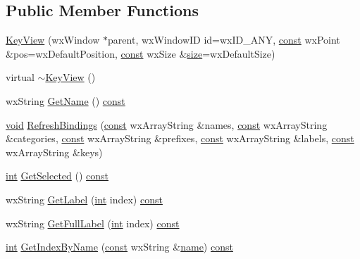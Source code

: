 \subsection*{Public Member Functions}
\begin{DoxyCompactItemize}
\item 
\hyperlink{class_key_view_a81715d180318fd6ce1ee5f579bc7c4a9}{Key\+View} (wx\+Window $\ast$parent, wx\+Window\+ID id=wx\+I\+D\+\_\+\+A\+NY, \hyperlink{getopt1_8c_a2c212835823e3c54a8ab6d95c652660e}{const} wx\+Point \&pos=wx\+Default\+Position, \hyperlink{getopt1_8c_a2c212835823e3c54a8ab6d95c652660e}{const} wx\+Size \&\hyperlink{group__lavu__mem_ga854352f53b148adc24983a58a1866d66}{size}=wx\+Default\+Size)
\item 
virtual \hyperlink{class_key_view_ad50256773e41462ffde77149263c8a77}{$\sim$\+Key\+View} ()
\item 
wx\+String \hyperlink{class_key_view_a21c8eb2a81caf3c441ab0f8536872448}{Get\+Name} () \hyperlink{getopt1_8c_a2c212835823e3c54a8ab6d95c652660e}{const} 
\item 
\hyperlink{sound_8c_ae35f5844602719cf66324f4de2a658b3}{void} \hyperlink{class_key_view_a23b8dd88ead7d355834002fae5e4815b}{Refresh\+Bindings} (\hyperlink{getopt1_8c_a2c212835823e3c54a8ab6d95c652660e}{const} wx\+Array\+String \&names, \hyperlink{getopt1_8c_a2c212835823e3c54a8ab6d95c652660e}{const} wx\+Array\+String \&categories, \hyperlink{getopt1_8c_a2c212835823e3c54a8ab6d95c652660e}{const} wx\+Array\+String \&prefixes, \hyperlink{getopt1_8c_a2c212835823e3c54a8ab6d95c652660e}{const} wx\+Array\+String \&labels, \hyperlink{getopt1_8c_a2c212835823e3c54a8ab6d95c652660e}{const} wx\+Array\+String \&keys)
\item 
\hyperlink{xmltok_8h_a5a0d4a5641ce434f1d23533f2b2e6653}{int} \hyperlink{class_key_view_a37e9544d08e2a38564e91d59542a22a1}{Get\+Selected} () \hyperlink{getopt1_8c_a2c212835823e3c54a8ab6d95c652660e}{const} 
\item 
wx\+String \hyperlink{class_key_view_a8002f9dd0157ab61540d1f4cc00a52e3}{Get\+Label} (\hyperlink{xmltok_8h_a5a0d4a5641ce434f1d23533f2b2e6653}{int} index) \hyperlink{getopt1_8c_a2c212835823e3c54a8ab6d95c652660e}{const} 
\item 
wx\+String \hyperlink{class_key_view_a5bfc5e5f6e8a965b075d9248b5a7c522}{Get\+Full\+Label} (\hyperlink{xmltok_8h_a5a0d4a5641ce434f1d23533f2b2e6653}{int} index) \hyperlink{getopt1_8c_a2c212835823e3c54a8ab6d95c652660e}{const} 
\item 
\hyperlink{xmltok_8h_a5a0d4a5641ce434f1d23533f2b2e6653}{int} \hyperlink{class_key_view_a717be08fe6d694e2031e766e359acf40}{Get\+Index\+By\+Name} (\hyperlink{getopt1_8c_a2c212835823e3c54a8ab6d95c652660e}{const} wx\+String \&\hyperlink{lib_2expat_8h_a1b49b495b59f9e73205b69ad1a2965b0}{name}) \hyperlink{getopt1_8c_a2c212835823e3c54a8ab6d95c652660e}{const} 

\end{DoxyCompactItemize}
